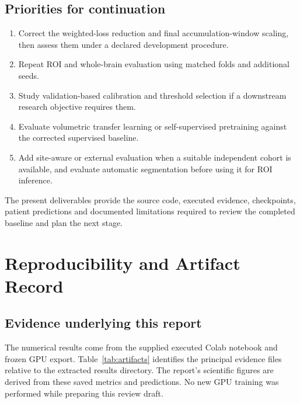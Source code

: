 \documentclass[12pt,a4paper,oneside]{report}
\begin{document}
\section{Priorities for continuation}
\begin{enumerate}
\item Correct the weighted-loss reduction and final accumulation-window scaling, then assess them under a declared development procedure.
\item Repeat ROI and whole-brain evaluation using matched folds and additional seeds.
\item Study validation-based calibration and threshold selection if a downstream research objective requires them.
\item Evaluate volumetric transfer learning or self-supervised pretraining against the corrected supervised baseline.
\item Add site-aware or external evaluation when a suitable independent cohort is available, and evaluate automatic segmentation before using it for ROI inference.
\end{enumerate}
The present deliverables provide the source code, executed evidence, checkpoints, patient predictions and documented limitations required to review the completed baseline and plan the next stage.

\appendix
\chapter{Reproducibility and Artifact Record}
\label{app:repro}
\section{Evidence underlying this report}
The numerical results come from the supplied executed Colab notebook and frozen GPU export. Table~\ref{tab:artifacts} identifies the principal evidence files relative to the extracted results directory. The report's scientific figures are derived from these saved metrics and predictions. No new GPU training was performed while preparing this review draft.
\end{document}
